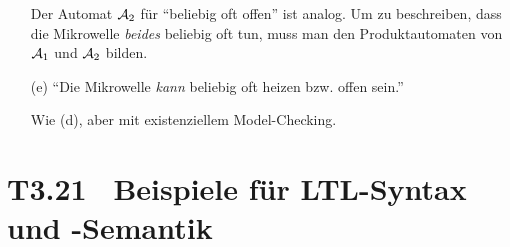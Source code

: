 \documentclass[fontsize=11pt, twoside=false, numbers=autoenddot]{scrbook}
\begin{document}
\begin{itemize}
\begin{center}
    \end{center}
    Der Automat $\mathcal{A}_2$ für "`beliebig oft offen"' ist analog.
    Um zu beschreiben, dass die Mikrowelle \emph{beides} beliebig oft tun,
    muss man den Produktautomaten von $\mathcal{A}_1$ und $\mathcal{A}_2$ bilden.
    
    \enlargethispage*{10mm}
  \item[(e)]
    "`Die Mikrowelle \emph{kann} beliebig oft heizen bzw. offen sein."'
    
    Wie (d), aber mit existenziellem Model-Checking.
\end{itemize}

\pagebreak
\section*{T3.21~ Beispiele für LTL-Syntax und -Semantik}
\end{document}
